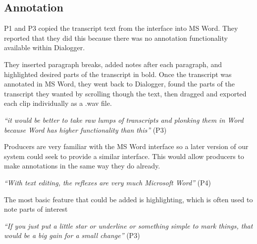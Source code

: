 



\subsection{Annotation}


P1 and P3 copied the transcript text from the interface into MS Word. They
reported that they did this because there was no annotation functionality
available within Dialogger.

They inserted paragraph breaks, added notes after each paragraph, and
highlighted desired parts of the transcript in bold. Once the transcript was
annotated in MS Word, they went back to Dialogger, found the parts of the
transcript they wanted by scrolling though the text, then dragged and
exported each clip individually as a .wav file.

\textit{``it would be better to take raw lumps of transcripts and plonking them
  in Word because Word has higher functionality than this''} (P3)

Producers are very familiar with the MS Word interface so a later version of our
system could seek to provide a similar interface. This would allow producers to
make annotations in the same way they do already.

\textit{``With text editing, the reflexes are very much Microsoft Word''} (P4)

The most basic feature that could be added is highlighting, which is often used
to note parts of interest

\textit{``If you just put a little star or underline or something simple to
  mark things, that would be a big gain for a small change''} (P3)

